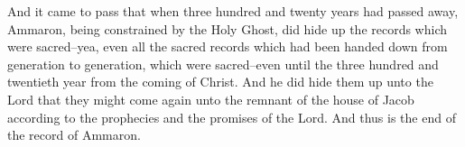 And it came to pass that when three hundred and twenty years had passed away, Ammaron, being constrained by the Holy Ghost, did hide up the records which were sacred--yea, even all the sacred records which had been handed down from generation to generation, which were sacred--even until the three hundred and twentieth year from the coming of Christ.
\bverse \iffalse And he did hide them up unto the Lord that they might come again unto the remnant of the house of Jacob according to the prophecies and the promises of the Lord. And thus is the end of the record of Ammaron. \fi
And he did hide them up unto the Lord that they might come again unto the remnant of the house of Jacob according to the prophecies and the promises of the Lord. And thus is the end of the record of Ammaron.
